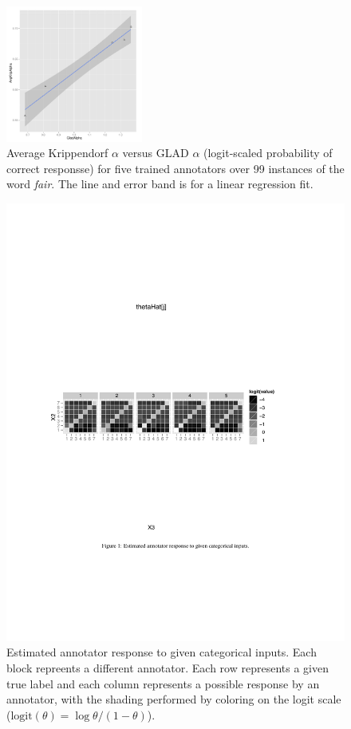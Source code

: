 \documentclass[11pt]{article}
\begin{document}
\begin{figure}
\begin{center}
\includegraphics[width=0.4\textwidth]{img/GladVsKripp.pdf}
\end{center}
\caption{Average Krippendorf $\alpha$ versus GLAD $\alpha$
  (logit-scaled probability of correct responsse) for five trained annotators
  over 99 instances of the word {\it fair}.  The line and error band is for a
  linear regression fit.}\label{glad-alpha.fig}
\end{figure}
%  
\begin{figure}[ht]
\includegraphics[width=\textwidth]{img/fair-response.pdf}
\caption{Estimated annotator response to given categorical inputs.
  Each block repreents a different annotator.  Each row represents a
  given true label and each column represents a possible response by
  an annotator, with the shading performed by coloring on the logit
  scale ($\mbox{logit}(\theta) = \log
  \theta/(1-\theta)$).}\label{dawid-skene.fig}
\end{figure}
\end{document}
